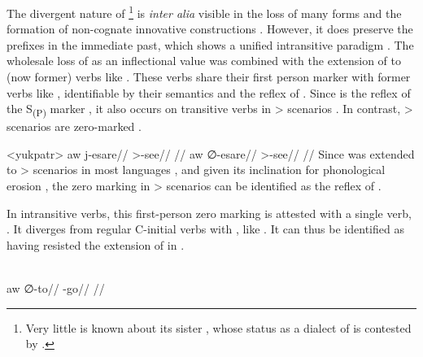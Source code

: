 \subsubsection{\yukpa {}}
\label{sec:yukpa}
The divergent nature of \yukpa\footnote{Very little is known about its sister \japreria, whose status as a dialect of \yukpa is contested by \textcite{oquendo2004japreria}.} is \textit{inter alia} visible in the loss of many \setone forms and the formation of non-cognate innovative constructions \parencite{meira2006syntactic}.
However, it does preserve the \setone prefixes in the immediate past, which shows a unified intransitive paradigm .
The wholesale loss of  as an inflectional value was combined with the extension of   to (now former)  verbs like  .
%
%
%
These verbs share their first person marker  with former  verbs like  , identifiable by their semantics and the reflex of \detrz.
Since  is the reflex of the \PC {}S\textsubscript{(P)} marker  \parencite[92]{gildea1998}, it also occurs on transitive verbs in > scenarios .
In contrast, > scenarios are zero-marked .

\pex<yukpatr>\yukpa \parencite[][139]{meira2006syntactic}
\begingl
\gla aw j-esare//
\glb {} >-see//
\glft {}//
\endgl
{}
\begingl
\gla aw {\normalfont ∅}-esare//
\glb {} >-see//
\glft {}//
\endgl
\xe
%
Since \PC {}  was extended to > scenarios in most languages \parencite[81--82]{gildea1998}, and given its inclination for phonological erosion , the zero marking in > scenarios can be identified as the \yukpa reflex of  .

In intransitive verbs, this first-person zero marking is attested with a single verb,   .
It diverges from regular C-initial verbs with , like  .
It can thus be identified as having resisted the extension of  in \yukpa.

\yukpa \parencite[][139]{meira2006syntactic}\\
\begingl
\gla aw {\normalfont ∅}-to//
\glb {} -go//
\glft {}//
\endgl
\xe

